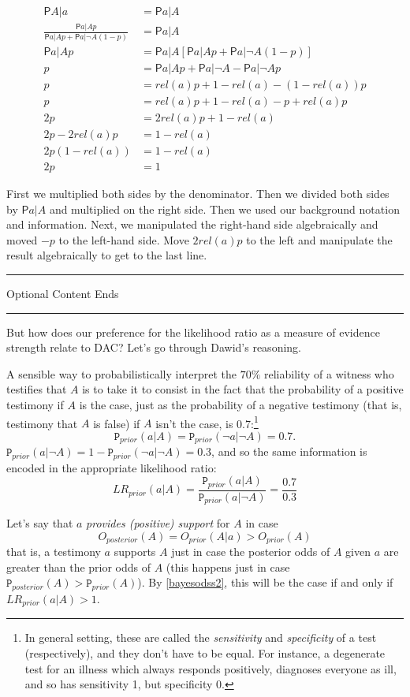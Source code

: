 \documentclass[10pt,dvipsnames,enabledeprecatedfontcommands]{scrartcl}
\newcommand{\n}{\neg}
\newcommand{\pr}{\mathsf{P}}
\newcommand{\prr}[1]{\mbox{$\mathtt{P}_{prior}(#1)$}}
\newcommand{\prp}[1]{\mbox{$\mathtt{P}_{posterior}(#1)$}}
\newcommand{\intermezzob}{\nopagebreak 
	\begin{minipage}[c]{13cm}
	\begin{center}\rule{10cm}{0.4pt}

	\tiny{\sc Optional Content Ends}
	
	\vspace{-1mm}
	
	\rule{10cm}{0.4pt}\end{center}
	\end{minipage}
	}
\begin{document}
\begin{align*}
 \pr{A\vert a}& = \pr{a\vert A}\\
 \frac{\pr{a\vert A}p}{\pr{a\vert A}p+\pr{a\vert \n A}(1-p)} &= \pr{a\vert A} \\
 \pr{a\vert A}p & = \pr{a\vert A}[\pr{a\vert A}p+\pr{a\vert \n A}(1-p)]\\
 p & = \pr{a\vert A}p + \pr{a\vert \n A} - \pr{a\vert \n A}p\\
 p &= rel(a) p + 1-rel(a)- (1-rel(a))p\\
 p & = rel(a)p +1 - rel(a) -p +rel(a)p \\
 2p & =  2rel(a)p + 1 - rel(a)  \\
 2p - 2 rel(a)p & = 1-rel(a)\\
 2p(1-rel(a)) &= 1-rel(a)\\
 2p & = 1
 \end{align*}

First we multiplied both sides by the denominator. Then we divided both
sides by \(\pr{a\vert A}\) and multiplied on the right side. Then we
used our background notation and information. Next, we manipulated the
right-hand side algebraically and moved \(-p\) to the left-hand side.
Move \(2rel(a)p\) to the left and manipulate the result algebraically to
get to the last line.

\intermezzob

But how does our preference for the likelihood ratio as a measure of
evidence strength relate to DAC? Let's go through Dawid's reasoning.

A sensible way to probabilistically interpret the \(70\%\) reliability
of a witness who testifies that \(A\) is to take it to consist in the
fact that the probability of a positive testimony if \(A\) is the case,
just as the probability of a negative testimony (that is, testimony that
\(A\) is false) if \(A\) isn't the case, is
0.7:\footnote{In general setting, these are called the \emph{sensitivity} and \emph{specificity} of a test (respectively), and they don't have to be equal. For instance, a degenerate test for an illness which always responds positively, diagnoses everyone as ill, and so has sensitivity 1, but specificity 0.}
\[\prr{a\vert A}=\prr{\n a\vert\n  A}=0.7.\]
\noindent   \(\prr{a\vert \n A}=1- \prr{\n a\vert \n A}=0.3\), and so
the same information is encoded in the appropriate likelihood ratio:
\[LR_{prior}(a\vert A )=\frac{\prr{a\vert A}}{\prr{a\vert \n A}}= \frac{0.7}{0.3}\]

Let's say that \(a\) \emph{provides (positive) support} for \(A\) in
case \[O_{posterior}(A)=O_{prior}(A\vert a)> O_{prior}(A)\]
\noindent  that is, a testimony \(a\) supports \(A\) just in case the
posterior odds of \(A\) given \(a\) are greater than the prior odds of
\(A\) (this happens just in case \(\prp{A}>\prr{A}\)). By
\eqref{bayesodss2}, this will be the case if and only if
\(LR_{prior}(a\vert A)>1\).
\end{document}
